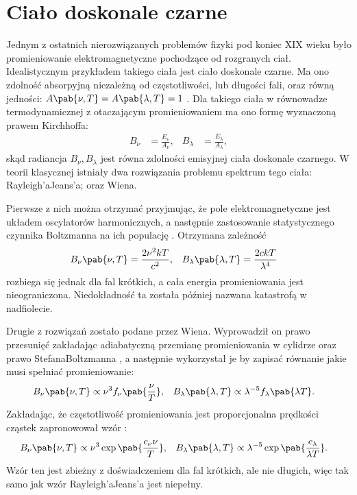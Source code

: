 \section{Ciało doskonale czarne}
Jednym z ostatnich nierozwiązanych problemów fizyki pod koniec XIX wieku było promieniowanie elektromagnetyczne pochodzące od rozgranych ciał. Idealistycznym przykładem takiego ciała jest ciało doskonale czarne. Ma ono zdolność absorpyjną niezależną od częstotliwości, lub długości fali, oraz równą jedności: \(A\pab{\nu, T} = A\pab{\lambda, T} = 1\) \cite{planck_theory_of_heat}. Dla takiego ciała w równowadze termodynamicznej z otaczającym promieniowaniem ma ono formę wyznaczoną prawem Kirchhoffa:
\begin{align}\label{eq:kirchhoff}
	B_{\nu} &= \frac{E_{\nu}}{A_{\nu}}, & 
	B_{\lambda} &= \frac{E_{\lambda}}{A_{\lambda}},
\end{align}
skąd radiancja \(B_{\nu}, B_{\lambda}\) jest równa zdolności emisyjnej ciała doskonale czarnego. W teorii klasycznej istniały dwa rozwiązania problemu spektrum tego ciała: Rayleigh'a\textendash Jeans'a; oraz Wiena. 

Pierwsze z nich można otrzymać przyjmując, że pole elektromagnetyczne jest układem oscylatorów harmonicznych, a następnie zastosowanie statystycznego czynnika Boltzmanna na ich populację \cite{bohm}. Otrzymana zależność
\begin{align*}
	B_{\nu}\pab{\nu, T} &= \frac{2\nu^2kT}{c^2}, & 
	B_{\lambda}\pab{\lambda, T} &= \frac{2ckT}{\lambda^4}
\end{align*}
rozbiega się jednak dla fal krótkich, a cała energia promieniowania jest nieograniczona. Niedokładność ta została później nazwana katastrofą w nadfiolecie. 

Drugie z rozwiązań zostało podane przez Wiena. Wyprowadził on prawo przesunięć zakładając adiabatyczną przemianę promieniowania w cylidrze oraz prawo Stefana\textendash Boltzmanna \cite{wien_displacement_law}, a następnie wykorzystał je by zapisać równanie jakie musi spełniać promieniowanie: 
\begin{align*}
	B_{\nu}\pab{\nu, T} &\propto \nu^3 f_{\nu}\pab{\frac{\nu}{T}}, & 
	B_{\lambda}\pab{\lambda, T} &\propto \lambda^{-5} f_{\lambda}\pab{\lambda T}.
\end{align*}
Zakładając, że częstotliwość promieniowania jest proporcjonalna prędkości cząstek zapronowował wzór \cite{wien_law}:
\begin{align*}
	B_{\nu}\pab{\nu, T} &\propto \nu^3 \exp\pab{\frac{c_{\nu}\nu}{T}}, & 
	B_{\lambda}\pab{\lambda, T} &\propto \lambda^{-5} \exp\pab{\frac{c_{\lambda}}{\lambda T}}.
\end{align*}
Wzór ten jest zbieżny z doświadczeniem dla fal krótkich, ale nie długich, więc tak samo jak wzór Rayleigh'a\textendash Jeans'a jest niepełny. 

